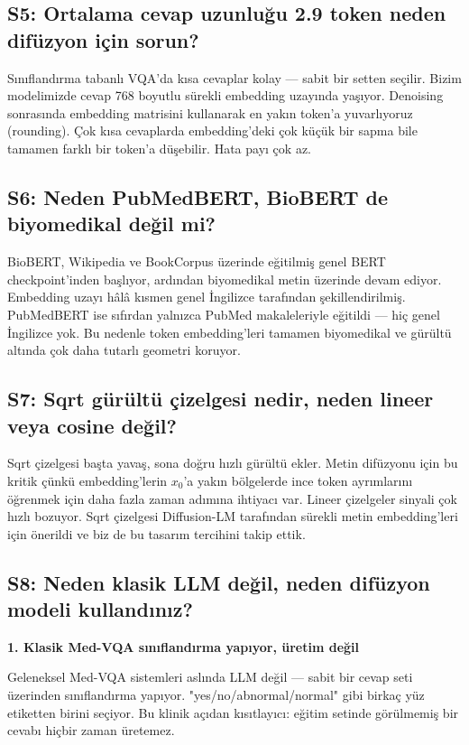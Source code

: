 \documentclass[12pt, a4paper]{article}
\begin{document}
\subsection*{S5: Ortalama cevap uzunluğu 2.9 token neden difüzyon için sorun?}

Sınıflandırma tabanlı VQA'da kısa cevaplar kolay — sabit bir setten seçilir. Bizim modelimizde cevap 768 boyutlu sürekli embedding uzayında yaşıyor. Denoising sonrasında embedding matrisini kullanarak en yakın token'a yuvarlıyoruz (rounding). Çok kısa cevaplarda embedding'deki çok küçük bir sapma bile tamamen farklı bir token'a düşebilir. Hata payı çok az.

\subsection*{S6: Neden PubMedBERT, BioBERT de biyomedikal değil mi?}

BioBERT, Wikipedia ve BookCorpus üzerinde eğitilmiş genel BERT checkpoint'inden başlıyor, ardından biyomedikal metin üzerinde devam ediyor. Embedding uzayı hâlâ kısmen genel İngilizce tarafından şekillendirilmiş. PubMedBERT ise sıfırdan yalnızca PubMed makaleleriyle eğitildi — hiç genel İngilizce yok. Bu nedenle token embedding'leri tamamen biyomedikal ve gürültü altında çok daha tutarlı geometri koruyor.

\subsection*{S7: Sqrt gürültü çizelgesi nedir, neden lineer veya cosine değil?}

Sqrt çizelgesi başta yavaş, sona doğru hızlı gürültü ekler. Metin difüzyonu için bu kritik çünkü embedding'lerin $x_0$'a yakın bölgelerde ince token ayrımlarını öğrenmek için daha fazla zaman adımına ihtiyacı var. Lineer çizelgeler sinyali çok hızlı bozuyor. Sqrt çizelgesi Diffusion-LM tarafından sürekli metin embedding'leri için önerildi ve biz de bu tasarım tercihini takip ettik.

\subsection*{S8: Neden klasik LLM değil, neden difüzyon modeli kullandınız?}

\textbf{1. Klasik Med-VQA sınıflandırma yapıyor, üretim değil}

Geleneksel Med-VQA sistemleri aslında LLM değil — sabit bir cevap seti üzerinden sınıflandırma yapıyor. "yes/no/abnormal/normal" gibi birkaç yüz etiketten birini seçiyor. Bu klinik açıdan kısıtlayıcı: eğitim setinde görülmemiş bir cevabı hiçbir zaman üretemez.
\end{document}
